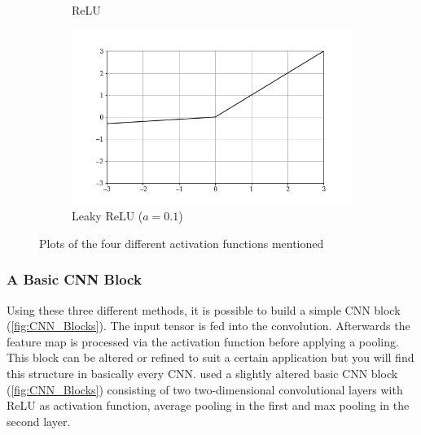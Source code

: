 \begin{figure}[h]
\begin{subfigure}{.5\textwidth}
  \caption{ReLU}
  \label{fig:ReLU}
\end{subfigure}
\begin{subfigure}{.5\textwidth}
  \centering
  \includegraphics[width=\linewidth]{images/Chapter2/L_ReLU.png}
  \caption{Leaky ReLU ($a=0.1$)}
  \label{fig:L_ReLU}
\end{subfigure}
\caption{Plots of the four different activation functions mentioned} 
\label{fig:activ_functions}
\end{figure}


\subsubsection*{A Basic CNN Block}
Using these three different methods, it is possible to build a simple CNN block (\autoref{fig:CNN_Blocks}). The input tensor is fed into the convolution. Afterwards the feature map is processed via the activation function before applying a pooling. \\
This block can be altered or refined to suit a certain application but you will find this structure in basically every CNN. \citet{Krippendorf_2023} used a slightly altered basic CNN block (\autoref{fig:CNN_Blocks}) consisting of two two-dimensional convolutional layers with ReLU as activation function, average pooling in the first and max pooling in the second layer. 

\newpage

